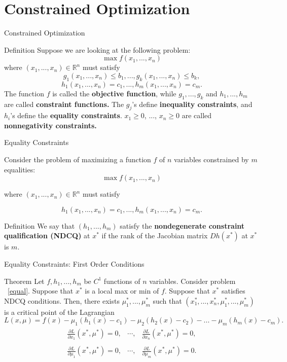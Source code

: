 \documentclass{beamer}
\begin{document}
\section{Constrained Optimization}
\begin{frame}{Constrained Optimization}
    \begin{block}{Definition}
    Suppose we are looking at the following problem:
    \[\max f(x_1,...,x_n)
    \]
     where $(x_1,..., x_n) \in \mathbb{R}^n$ must satisfy
     \[g_1(x_1,..., x_n)\leq b_1,..., g_k(x_1,..., x_n)\leq b_k,
     \]
     \[h_1(x_1,..., x_n)= c_1,..., h_m(x_1,..., x_n)= c_m.
     \]
     The function $f$ is called the \textbf{objective function}, while $g_1,..., g_k$ and $h_1,..., h_m$ are called \textbf{constraint functions.} The $g_j$'s define \textbf{inequality constraints}, and $h_i$'s define the \textbf{equality constraints}. $x_1\geq 0$, ..., $x_n\geq 0 $ are called \textbf{nonnegativity constraints. }
\end{block}
\end{frame}
\begin{frame}{Equality Constraints}

Consider the problem of maximizing a function $f$ of $n$ variables constrained by $m$ equalities:
\begin{equation}
    \max f(x_1,...,x_n) \label{equal}
    \end{equation}
    
     where $(x_1,..., x_n) \in \mathbb{R}^n$ must satisfy
     
     \[h_1(x_1,..., x_n)= c_1,..., h_m(x_1,..., x_n)= c_m.
     \]
     \begin{block}{Definition}
         We say that $(h_1,..., h_m)$ satisfy the \textbf{nondegenerate constraint qualification (NDCQ)} at $x^*$ if the rank of the Jacobian matrix $Dh(x^*)$ at $x^*$ is $m$.
     \end{block}
\end{frame}
\begin{frame}{Equality Constraints: First Order Conditions}
\begin{block}{Theorem}
      Let $f, h_1,..., h_m$ be $C^1$ functions of $n$ variables. Consider problem ~\eqref{equal}. Suppose that $x^*$ is a local max or min of $f$. Suppose that $x^*$ satisfies NDCQ conditions. Then, there exists $\mu_1^*,..., \mu_m^*$ such that $(x_1^*,..., x_n^*, \mu_1^*,..., \mu_m^*)$ is a critical point of the Lagrangian 
    \[L(x, \mu)=f(x)-\mu_1(h_1(x)-c_1)-\mu_2(h_2(x)-c_2)-...-\mu_m(h_m(x)-c_m).
    \]
    \begin{align*}
        \begin{array}{ccc}
           \frac{\partial L}{\partial x_1}(x^*, \mu^*)=0,  & \cdots, & \frac{\partial L}{\partial x_n}(x^*, \mu^*)=0, \\
           & & \\
            \frac{\partial L}{\partial \mu_1}(x^*, \mu^*)=0,  & \cdots, & \frac{\partial L}{\partial \mu_m}(x^*, \mu^*)=0.
        \end{array}
    \end{align*}
\end{block}

\end{frame}
\end{document}
